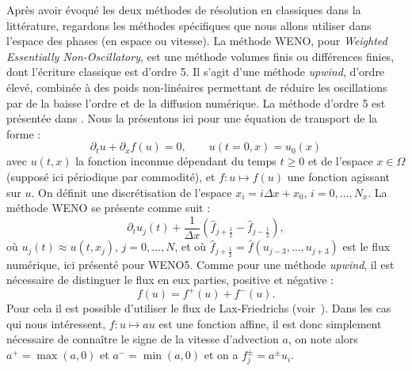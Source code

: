 Après avoir évoqué les deux méthodes de résolution en classiques dans la littérature, regardons les méthodes spécifiques que nous allons utiliser dans l'espace des phases (en espace ou vitesse). La méthode WENO, pour \emph{Weighted Essentially Non-Oscillatory}, est une méthode volumes finis ou différences finies, dont l'écriture classique est d'ordre 5. Il s'agit d'une méthode \emph{upwind}, d'ordre élevé, combinée à des poids non-linéaires permettant de réduire les oscillations par de la baisse l'ordre et de la diffusion numérique. La méthode d'ordre 5 est présentée dans \cite{Liu:1994,Jiang:1996,Shu:1999,Shu:2003}. Nous la présentons ici pour une équation de transport de la forme :
$$
  \partial_t u + \partial_x f(u) = 0,\qquad u(t=0,x) = u_0(x)
$$
avec $u(t,x)$ la fonction inconnue dépendant du temps $t\geq 0$ et de l'espace $x\in\Omega$ (supposé ici périodique par commodité), et $f:u\mapsto f(u)$ une fonction agissant sur $u$. On définit une discrétisation de l'espace $x_i = i\Delta x + x_0$, $i=0,\dots,N_x$. La méthode WENO se présente comme suit :
$$
  \partial_t u_j(t) + \frac{1}{\Delta x}\left( \hat{f}_{j+\frac{1}{2}} - \hat{f}_{j-\frac{1}{2}} \right),
$$
où $u_j(t)\approx u(t,x_j)$, $j=0,\dots,N$, et où $\hat{f}_{j+\frac{1}{2}} = \hat{f}(u_{j-3},\dots,u_{j+3})$ est le flux numérique, ici présenté pour WENO5. Comme pour une méthode \emph{upwind}, il est nécessaire de distinguer le flux en eux parties, positive et négative :
$$
  f(u) = f^+(u) + f^-(u).
$$
Pour cela il est possible d'utiliser le flux de Lax-Friedrichs (voir~\cite{Shu:1997}). Dans les cas qui nous intéressent, $f:u\mapsto au$ est une fonction affine, il est donc simplement nécessaire de connaître le signe de la vitesse d'advection $a$, on note alors $a^+ = \max(a,0)$ et $a^-=\min(a,0)$ et on a $f^\pm_j=a^\pm u_i$.

